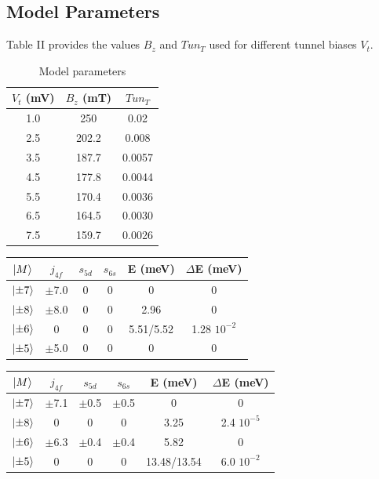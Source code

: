 \documentclass[
reprint,amsmath,amssymb,aps]{revtex4-2}
\begin{document}
\subsection{Model Parameters}
\label{app:STM_param}
Table II provides the values $B_{z}$ and $Tun_{T}$ used for different tunnel biases $V_{t}$. \\

\renewcommand{\arraystretch}{2} 
\begin{table}[H]
\centering
 \begin{tabular}{ccc}
 \hline
 \hline
 $V_{t}$ (mV) & $B_{z}$ (mT) & $Tun_{T}$ 
 \\ [1ex] 
 \hline 
 1.0 & 250 & 0.02 \\
 2.5 & 202.2 & 0.008 \\
 3.5 & 187.7 & 0.0057 \\
 4.5 & 177.8 & 0.0044 \\
 5.5 & 170.4 & 0.0036 \\
 6.5 & 164.5 & 0.0030 \\
 7.5 & 159.7 & 0.0026 \\
 \hline
 \hline
 \end{tabular}
 \caption{Model parameters}
\end{table}


\newpage

\begin{table}
    \begin{tabular}{cccccc}
    \hline
    \hline
    $\ket{M}$ & $j_{4f}$ & $s_{5d}$ & $s_{6s}$ & E (meV) & $\Delta$E (meV)\\
    \hline
    $\ket{\pm 7}$ & $\pm$7.0 & 0 & 0 & 0 & 0     \\
    $\ket{\pm 8}$ & $\pm$8.0 & 0 & 0 & 2.96 & 0    \\
    $\ket{\pm 6}$ & 0 & 0 & 0 & 5.51/5.52 &   1.28 $10^{-2}$   \\
    $\ket{\pm 5}$ & $\pm$5.0 & 0 & 0 & 0 & 0      \\
    \hline
    \hline
    \end{tabular}
\end{table}

\begin{table}
    \begin{tabular}{cccccc}
    \hline
    \hline
    $\ket{M}$ & $j_{4f}$ & $s_{5d}$ & $s_{6s}$ & E (meV) & $\Delta$E (meV)\\
    \hline
    $\ket{\pm 7}$ & $\pm$7.1 & $\pm$0.5 & $\pm$0.5 & 0 & 0     \\
    $\ket{\pm 8}$ & 0 & 0 & 0 & 3.25 & 2.4 $10^{-5}$    \\
    $\ket{\pm 6}$ & $\pm$6.3 & $\pm$0.4 & $\pm$0.4 & 5.82 &   0   \\
    $\ket{\pm 5}$ & 0 & 0 & 0 & 13.48/13.54 & 6.0 $10^{-2}$       \\ 
    \hline
    \hline
    \end{tabular}
\end{table}
\end{document}
